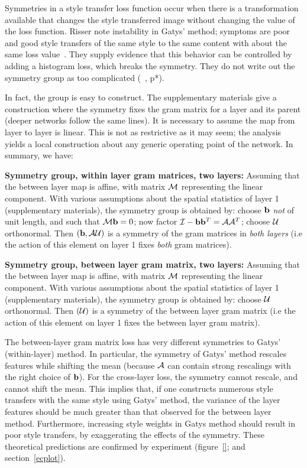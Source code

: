 \documentclass[runningheads]{llncs}
\newcommand{\vect}[1]{{\bf {#1}}}
\newcommand{\matx}[1]{{\cal {#1}}}
\begin{document}
Symmetries in a style transfer loss function occur when there is a transformation available that changes the style
transferred image without changing the value of the loss function.   Risser \ea note instability in Gatys' method;
symptoms are poor and good style transfers of the same style to the same content with about the same loss value~\cite{}.
They supply evidence that this behavior can be controlled by adding a histogram loss, which breaks the symmetry.
They do not write out the symmetry group as too complicated (~\cite{}, p*).  

In fact, the group is easy to construct.  
The supplementary materials give a construction where the symmetry fixes the gram matrix for a layer and its parent
(deeper networks follow the same lines).  It is necessary to assume the map from layer to layer is linear.  This is not
as restrictive as it may seem; the analysis yields a local construction about any generic operating point of the
network.  In summary, we have:

{\bf Symmetry group, within layer gram matrices, two layers:}
Assuming that the between layer map is affine, with matrix $\matx{M}$
representing the linear component.  With various assumptions about the 
spatial statistics of layer 1 (supplementary materials), the symmetry
group is obtained by:  choose $\vect{b}$ {\em not} of unit length, and
such that $\matx{M}\vect{b}=0$; now factor
$\matx{I}-\vect{b}\vect{b}^T=\matx{A}\matx{A}^T$; choose $\matx{U}$
orthonormal.  Then $(\vect{b}, \matx{A}\matx{U})$ is a symmetry of the
gram matrices in {\em both layers} (i.e the action of this element on
layer 1 fixes {\em both} gram matrices).

{\bf Symmetry group, between layer gram matrix, two layers:}
Assuming that the between layer map is affine, with matrix $\matx{M}$
representing the linear component.  With various assumptions about the 
spatial statistics of layer 1 (supplementary materials), the symmetry
group is obtained by:  choose $\matx{U}$
orthonormal.  Then $(\matx{U})$ is a symmetry of the between layer
gram matrix (i.e the action of this element on layer 1 fixes the
between layer gram matrix).


 The between-layer gram matrix loss has very different symmetries to Gatys'
(within-layer) method.  In particular, the symmetry of Gatys' method rescales
features while shifting the mean (because $\matx{A}$ can contain
strong rescalings with the right choice of $\vect{b}$).   For the
cross-layer loss, the symmetry cannot rescale, and cannot shift the
mean.   This implies that, if one constructs numerous style
transfers with the same style using Gatys' method, the variance of the layer features should be much greater than that
observed for the between layer method.  Furthermore, increasing style weights in Gatys method should result in poor
style transfers, by exaggerating the effects of the symmetry.  These theoretical predictions are confirmed by experiment (figure~\ref{}; and
section~\ref{ecplot}).
\end{document}
